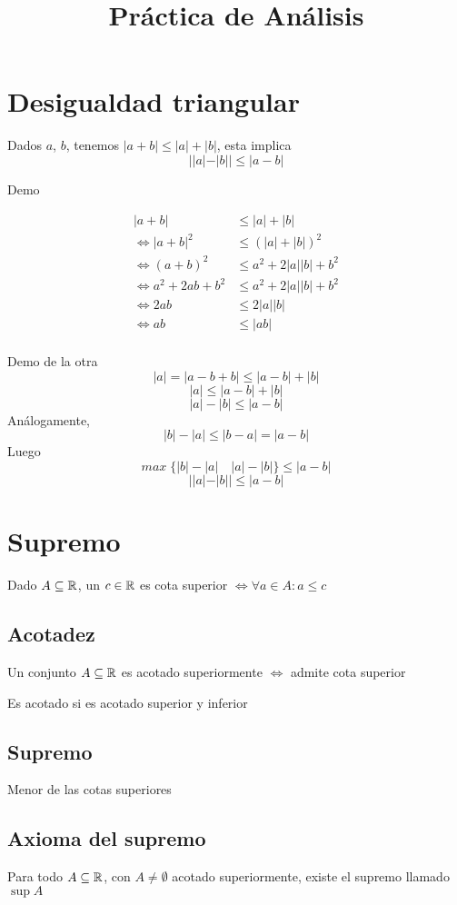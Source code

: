 \documentclass{article}
\title{Práctica de Análisis}
\begin{document}
\maketitle
\section{Desigualdad triangular}
Dados $a$, $b$, tenemos $|a + b| \leq |a| + |b|$, esta implica \[
	||a| - |b|| \leq |a-b|
\]

Demo

\begin{align*}
	|a+b| &\leq |a| + |b| \\
	\iff |a+b|^2 &\leq (|a| + |b|)^2 \\
	\iff (a+b)^2 &\leq a^2 + 2|a||b| + b^2 \\
	\iff a^2 + 2ab + b^2 &\leq a^2 + 2|a||b| + b^2 \\
	\iff 2ab &\leq 2|a||b| \\
	\iff ab  &\leq |ab| \\
\end{align*}

Demo de la otra
\[
	|a| = |a-b+b| \leq |a-b| + |b|
\]
\[
	|a| \leq |a-b| + |b|
\]
\[
	|a| - |b| \leq |a-b|
\]
Análogamente, 
\[
	|b| - |a| \leq |b-a| = |a-b|
\]
Luego 
\[
	max \; \{|b| - |a| \quad |a| - |b|\} \leq |a-b|
\]
\[
	||a| - |b|| \leq |a-b|
\]

\section{Supremo}
Dado $A \subseteq \mathbb{R}$, un $c \in \mathbb{R}$ es cota superior $\iff \forall a \in A: a \leq c$
\subsection{Acotadez}
Un conjunto $A \subseteq \mathbb{R}$ es acotado superiormente $\iff$ admite cota superior

Es acotado si es acotado superior y inferior
\subsection{Supremo}
Menor de las cotas superiores
\subsection{Axioma del supremo}
Para todo $A \subseteq \mathbb{R}$, con $A \ne \emptyset$ acotado superiormente,
existe el supremo llamado $\sup A$
\end{document}
